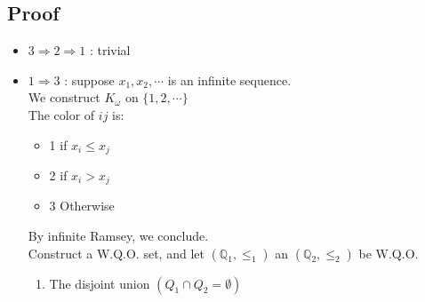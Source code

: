         \subsection{Proof}
        \begin{itemize}
            \item $3\Rightarrow 2\Rightarrow 1$ : trivial
            \item $1\Rightarrow 3$ : suppose $x_1, x_2, \cdots$ is an infinite sequence.\\
                We construct $K_\omega$ on $\{1, 2, \cdots\}$\\
                The color of $ij$ is:
                \begin{itemize}
                    \item 1 if $x_i\leq x_j$
                    \item 2 if $x_i> x_j$
                    \item 3 Otherwise
                \end{itemize}
                By infinite Ramsey, we conclude.\\
                Construct a W.Q.O. set, and let $(\mathbb{Q}_1, \leq_1)$ an $(\mathbb{Q}_2, \leq_2)$ be W.Q.O.
                \begin{enumerate}
                    \item The disjoint union $(Q_1\cap Q_2=\emptyset)$\\

                \end{enumerate}
        \end{itemize}
